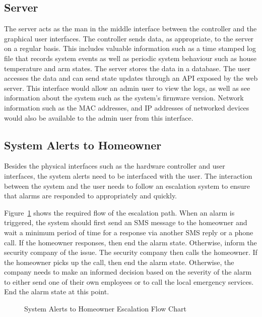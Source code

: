 \documentclass{report}
\begin{document}
\subsection{Server}
The server acts as the man in the middle interface between the controller and
the graphical user interfaces. The controller sends data, as appropriate, to
the server on a regular basis. This includes valuable information such as
a time stamped log file that records system events as well as periodic system
behaviour such as house temperature and arm states. The server stores the data in a 
database. The user accesses the data and can send state updates through an API 
exposed by the web server. This interface would allow an admin user to view the
logs, as well as see information about the system such as the system's firmware 
version. Network information such as the MAC addresses, and IP addresses of 
networked devices would also be available to the admin user from this interface.

\subsection{System Alerts to Homeowner}
Besides the physical interfaces such as the hardware controller and user
interfaces, the system alerts need to be interfaced with the user. The
interaction between the system and the user needs to follow an escalation
system to ensure that alarms are responded to appropriately and quickly.

Figure~\ref{fig:system_to_user_chart} shows the required flow of the escalation
path. When an alarm is triggered, the system should first send an SMS message
to the homeowner and wait a minimum period of time for a response via another
SMS reply or a phone call. If the homeowner responses, then end the alarm
state. Otherwise, inform the security company of the issue. The security
company then calls the homeowner. If the homeowner picks up the call, then end
the alarm state. Otherwise, the company needs to make an informed decision
based on the severity of the alarm to either send one of their own employees
or to call the local emergency services. End the alarm state at this point.

\begin{figure}[hp]
    \centering
        \caption{System Alerts to Homeowner Escalation Flow Chart}
        \scriptsize
        \setlength{\unitlength}{2.0em}
        
        \normalsize
    \label{fig:system_to_user_chart}
\end{figure}
\end{document}
